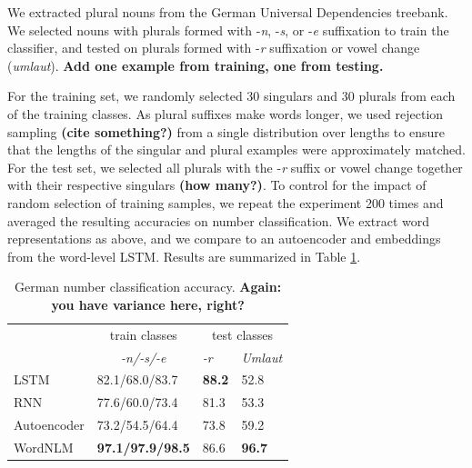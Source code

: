 We extracted plural nouns from the German Universal Dependencies
treebank\cite{de2006generating,mcdonald2013universal}.  We selected
nouns with plurals formed with -\emph{n}, -\emph{s}, or -\emph{e}
suffixation to train the classifier, and tested on plurals formed with
-\emph{r} suffixation or vowel change (\emph{umlaut}). \textbf{Add one
  example from training, one from testing.}

For the training set, we randomly selected 30 singulars and 30 plurals
from each of the training classes.  As plural suffixes make words
longer, we used rejection sampling \textbf{(cite something?)} from a
single distribution over lengths to ensure that the lengths of the
singular and plural examples were approximately matched.  For the test
set, we selected all plurals with the -\emph{r} suffix or vowel change
together with their respective singulars \textbf{(how many?)}. To
control for the impact of random selection of training samples, we
repeat the experiment 200 times and averaged the resulting accuracies
on number classification.  We extract word representations as above,
and we compare to an autoencoder and embeddings from the word-level
LSTM. Results are summarized in Table \ref{tab:number-results}.


\begin{table}[t]
  \begin{center}
    \begin{tabular}{l|l|l|l}
      &\multicolumn{1}{c}{train classes}&\multicolumn{2}{|c}{test classes}\\
      &\multicolumn{1}{c}{\emph{-n/-s/-e}}&\emph{-r}&\emph{Umlaut}\\      \hline
      LSTM& 82.1/68.0/83.7  & \textbf{88.2} & 52.8 \\
      RNN& 77.6/60.0/73.4 & 81.3 & 53.3\\
      Autoencoder& 73.2/54.5/64.4 & 73.8 & 59.2\\
      WordNLM& \textbf{97.1/97.9/98.5} & 86.6 & \textbf{96.7}  \\ %
    \end{tabular}
  \end{center}
  \caption{\label{tab:number-results} German number classification accuracy. \textbf{Again: you have variance here, right?}}
\end{table}



